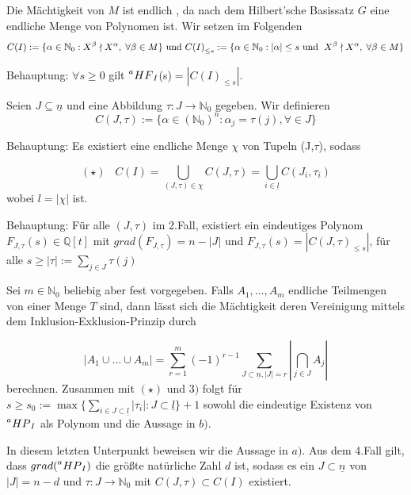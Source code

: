 \documentclass{article}
\newcommand*{\indx}[2]{{#1}_{#2}}
\newcommand*{\potx}[2]{{#1}^{#2}}
\newcommand*{\N}{\mathbb{N}_0}
\newcommand*{\hf}[1]{$\prescript{a}{}{HF}_{#1}$}
\newcommand*{\hp}[1]{$\prescript{a}{}{HP}_{#1}$}
\begin{document}
Die Mächtigkeit von $M$ ist endlich , da nach dem Hilbert'sche Basissatz $G$ eine endliche Menge von Polynomen ist.
Wir setzen im Folgenden 
\begin{displaymath}
C(I):=\{\alpha \in \N: \potx{X}{\beta} \nmid \potx{X}{\alpha},\; \forall \beta \in M \}
\textnormal{ und } 
\indx{C(I)}{\leq s}:= \{\alpha \in \N:|\alpha|\leq s \textnormal{ und } \; \potx{X}{\beta} \nmid \potx{X}{\alpha},\; \forall \beta \in M \}
\end{displaymath}

\begin{compactenum}
\item Behauptung: $\forall s\geq 0$ gilt \hf{I}(s)$=|\indx{C(I)}{\leq s}|$.\\
\item Seien $J\subseteq \underline{n}$ und eine Abbildung $\tau:J\longrightarrow \N$ gegeben. Wir definieren
\begin{displaymath}
C(J,\tau):=\{\alpha \in (\N)^n: \indx{\alpha}{j}=\tau(j), \forall \in J  \}
\end{displaymath}

Behauptung: Es existiert eine endliche Menge $\chi$ von Tupeln (J,$\tau$), sodass 

\begin{displaymath}
(\star)\;\;\;   C(I)=\bigcup\limits_{(J,\tau)\in \chi} C(J,\tau) =\bigcup\limits_{i\in \underline{l}} C(\indx{J}{i},\indx{\tau}{i})  
\end{displaymath}
wobei $l=|\chi|$ ist.\\
\item Behauptung: Für alle $(J,\tau)$ im 2.Fall, existiert ein eindeutiges Polynom $\indx{F}{J,\tau}(s)\in \mathbb{Q}[t]$ mit $grad(\indx{F}{J,\tau})=n-|J|$ und
$\indx{F}{J,\tau}(s)=\left|\indx{C(J,\tau)}{\leq s}\right|$, für alle $s\geq |\tau|:=\sum\limits_{j\in J}\tau(j)$\\
\item Sei $m\in\N$ beliebig aber fest vorgegeben. Falls $\indx{A}{1},\ldots,\indx{A}{m}$ endliche Teilmengen von einer Menge $T$ sind, dann lässt sich die Mächtigkeit deren Vereinigung mittels dem Inklusion-Exklusion-Prinzip durch

\begin{displaymath}
\left|\indx{A}{1}\cup\ldots\cup\indx{A}{m}\right|=\sum\limits_{r=1}^{m}(-1)^{r-1}\sum\limits_{J\subset\underline{n},\left|J\right|=r}{|\bigcap\limits_{j\in J}\indx{A}{j}|}
\end{displaymath}
berechnen. Zusammen mit $(\star)$ und $3)$ folgt für $s\geq \indx{s}{0}:=\max{\{\sum\limits_{i\in J\subset \underline{l}}|\indx{\tau}{i}|: J\subset \underline{l}\}}+1$ sowohl die eindeutige Existenz von \hp{I} als Polynom und die Aussage in $b)$. \\
\item In diesem letzten Unterpunkt beweisen wir die Aussage in $a)$. Aus dem 4.Fall gilt, dass $grad(\textnormal{\hp{I}})$ die größte natürliche Zahl $d$ ist, sodass es ein $J\subset\underline{n}$ von $|J|=n-d$ und $\tau: J\rightarrow\N$ mit $C(J,\tau)\subset C(I)$  existiert. 


\end{compactenum}
\end{document}
